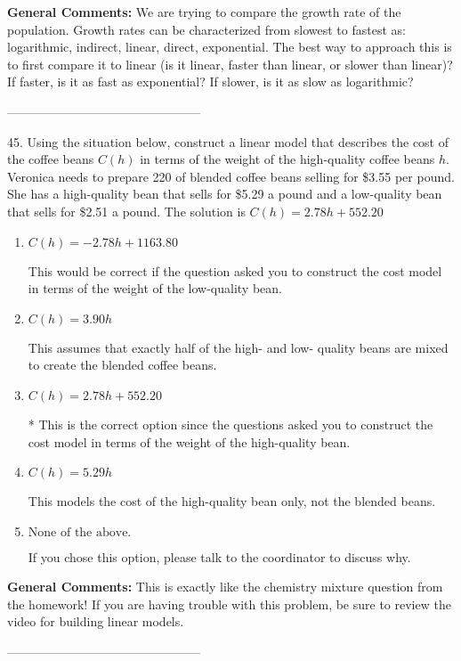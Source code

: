 \documentclass{extbook}[14pt]
\begin{document}
\textbf{General Comments:} We are trying to compare the growth rate of the population. Growth rates can be characterized from slowest to fastest as: logarithmic, indirect, linear, direct, exponential. The best way to approach this is to first compare it to linear (is it linear, faster than linear, or slower than linear)? If faster, is it as fast as exponential? If slower, is it as slow as logarithmic?

-----------------------------------------------

45. Using the situation below, construct a linear model that describes the cost of the coffee beans $C(h)$ in terms of the weight of the high-quality coffee beans $h$.
Veronica needs to prepare 220 of blended coffee beans selling for \$3.55 per pound. She has a high-quality bean that sells for \$5.29 a pound and a low-quality bean that sells for \$2.51 a pound. 
The solution is $ C(h) = 2.78 h + 552.20 $ 

\begin{enumerate}[label=\Alph*.] 
\item $ C(h) = -2.78 h + 1163.80 $ 

 This would be correct if the question asked you to construct the cost model in terms of the weight of the low-quality bean. 
\item $ C(h) = 3.90 h $ 

 This assumes that exactly half of the high- and low- quality beans are mixed to create the blended coffee beans. 
\item $ C(h) = 2.78 h + 552.20 $ 

 * This is the correct option since the questions asked you to construct the cost model in terms of the weight of the high-quality bean. 
\item $ C(h) = 5.29 h $ 

 This models the cost of the high-quality bean only, not the blended beans. 
\item $ \text{None of the above.} $ 

 If you chose this option, please talk to the coordinator to discuss why. 
\end{enumerate} 
 
\textbf{General Comments:} This is exactly like the chemistry mixture question from the homework! If you are having trouble with this problem, be sure to review the video for building linear models.

-----------------------------------------------
\end{document}
